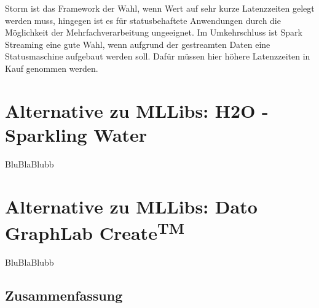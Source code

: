 Storm ist das Framework der Wahl, wenn Wert auf sehr kurze Latenzzeiten gelegt werden muss, hingegen ist es für statusbehaftete Anwendungen durch die Möglichkeit der Mehrfachverarbeitung ungeeignet. Im Umkehrschluss ist Spark Streaming eine gute Wahl, wenn aufgrund der gestreamten Daten eine Statusmaschine aufgebaut werden soll. Dafür müssen hier höhere Latenzzeiten in Kauf genommen werden.     

\section{Alternative zu MLLibs: H2O - Sparkling Water}
\label{section:h20}


BluBlaBlubb


\section{Alternative zu MLLibs: Dato GraphLab Create\textsuperscript{TM}}
\label{section:h20}


BluBlaBlubb



\subsection{Zusammenfassung}
\label{section:storm}




